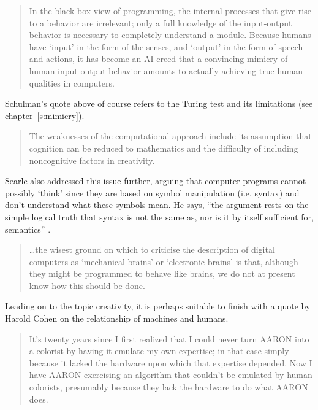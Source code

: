 \begin{quotation}
  In the black box view of programming, the internal processes that give rise to a behavior are irrelevant; only a full knowledge of the input-output behavior is necessary to completely understand a module. Because humans have `input' in the form of the senses, and `output' in the form of speech and actions, it has become an AI creed that a convincing mimicry of human input-output behavior amounts to actually achieving true human qualities in computers. 
\end{quotation}

Schulman's quote above of course refers to the Turing test and its limitations (see chapter~\ref{s:mimicry}).

\begin{quotation}
  The weaknesses of the computational approach include its assumption that cognition can be reduced to mathematics and the difficulty of including noncognitive factors in creativity. 
\end{quotation}

Searle also addressed this issue further, arguing that computer programs cannot possibly `think' since they are based on symbol manipulation (i.e. syntax) and don't understand what these symbols mean. He says, ``the argument rests on the simple logical truth that syntax is not the same as, nor is it by itself sufficient for, semantics'' \autocite*{Searle1990}.

\begin{quotation}
  \ldots the wisest ground on which to criticise the description of digital computers as `mechanical brains' or `electronic brains' is that, although they might be programmed to behave like brains, we do not at present know how this should be done.  
\end{quotation}

Leading on to the topic creativity, it is perhaps suitable to finish with a quote by Harold Cohen on the relationship of machines and humans.

\begin{quotation}
  It's twenty years since I first realized that I could never turn AARON into a colorist by having it emulate my own expertise; in that case simply because it lacked the hardware upon which that expertise depended. Now I have AARON exercising an algorithm that couldn't be emulated by human colorists, presumably because they lack the hardware to do what AARON does. 
\end{quotation}


